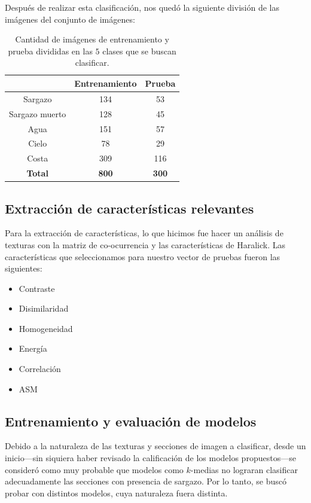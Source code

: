 \documentclass[conference]{IEEEtran}
\begin{document}
Después de realizar esta clasificación, nos quedó la siguiente división de las imágenes del conjunto de imágenes:

\begin{table}[H]
    \centering
    \begin{tabular}{|c|c|c|}
    	\hline
		 & Entrenamiento & Prueba \\ \hline
         Sargazo & 134 & 53 \\ \hline
         Sargazo muerto & 128 & 45 \\ \hline
         Agua & 151 & 57 \\ \hline
		 Cielo & 78 & 29 \\ \hline
         Costa & 309 & 116 \\ \hline
         \textbf{Total} & \textbf{800} & \textbf{300} \\ \hline                          
    \end{tabular}
    \caption{Cantidad de imágenes de entrenamiento y prueba divididas en las $5$ clases que se buscan clasificar.}
    \label{tab:svd_dimensions}
\end{table}

\subsection{Extracción de características relevantes}

Para la extracción de características, lo que hicimos fue hacer un análisis de texturas con la matriz de co-ocurrencia y las características de Haralick. Las características que seleccionamos para nuestro vector de pruebas fueron las siguientes:

\begin{itemize}
    \item Contraste
    \item Disimilaridad
    \item Homogeneidad
    \item Energía
    \item Correlación
    \item ASM
\end{itemize}


\subsection{Entrenamiento y evaluación de modelos }

Debido a la naturaleza de las texturas y secciones de imagen a clasificar, desde un inicio---sin siquiera haber revisado la calificación de los modelos propuestos---se consideró como muy probable que modelos como $k$-medias no lograran clasificar adecuadamente las secciones con presencia de sargazo. Por lo tanto, se buscó probar con distintos modelos, cuya naturaleza fuera distinta.
\end{document}
